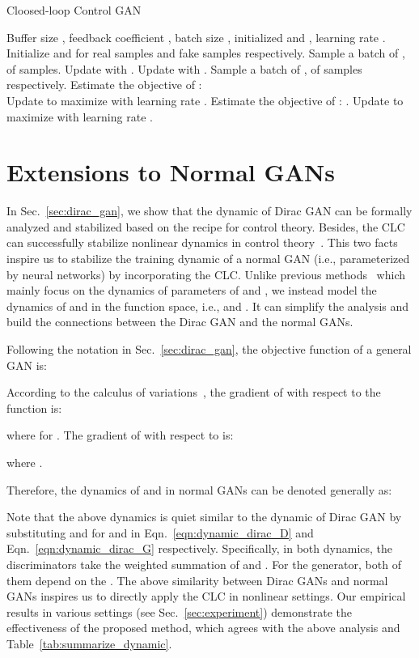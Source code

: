 \documentclass{article}
\newcommand{\tabl}[1]{Table~\ref{tab:#1}}
\newcommand{\eqn}[1]{Eqn.~\eqref{eqn:#1}}
\newcommand{\secref}[1]{Sec.~\ref{sec:#1}} \usepackage{wrapfig}
\theoremstyle{definition}
\begin{document}
\begin{algorithm}[t]
	\begin{algorithmic}[1]
\caption{Cloosed-loop Control GAN}\label{algo:NFGAN}
		 Buffer size , feedback coefficient , batch size , initialized  and , learning rate .
		\STATE Initialize  and  for real samples and fake samples respectively.
		\REPEAT
		\STATE Sample a batch of ,  of  samples.
		\STATE Update  with . Update  with .
		\STATE Sample a batch of ,  of  samples respectively.
		\STATE Estimate the objective of :\\
		
		\STATE Update  to maximize  with learning rate .
		\STATE Estimate the objective of :
		.
		\STATE Update  to maximize  with learning rate .
	\end{algorithmic}
\end{algorithm}

\section{Extensions to Normal GANs}\label{sec:normal_gan}


In \secref{dirac_gan}, we show that the dynamic of Dirac GAN can be formally analyzed and stabilized based on the recipe for control theory.
Besides, the CLC can successfully stabilize nonlinear dynamics in control theory~\cite{khalil2002nonlinear}.
This two facts inspire us to stabilize the training dynamic of a normal GAN (i.e., parameterized by neural networks) by incorporating the CLC.
Unlike previous methods~\cite{mescheder2018training} which mainly focus on the dynamics of parameters of  and , we instead model the dynamics of  and  in the function space, i.e.,  and . It can simplify the analysis and build the connections between the Dirac GAN and the normal GANs.


Following the notation in \secref{dirac_gan}, the objective function of a general GAN is:

According to the calculus of variations~\citep{gelfand2000calculus}, the gradient of  with respect to the function  is:

where  for .
The gradient of  with respect to  is:

where .


Therefore, the dynamics of  and  in normal GANs can be denoted generally as:

Note that the above dynamics is quiet similar to the dynamic of Dirac GAN by substituting  and  for  and  in \eqn{dynamic_dirac_D} and \eqn{dynamic_dirac_G} respectively.
Specifically, in both dynamics, the discriminators take the weighted summation of  and . For the generator, both of them depend on the .
The above similarity between Dirac GANs and normal GANs inspires us to directly apply the CLC in nonlinear settings. Our empirical results in various settings (see \secref{experiment}) demonstrate the effectiveness of the proposed method, which agrees with the above analysis and \tabl{summarize_dynamic}.
\end{document}
